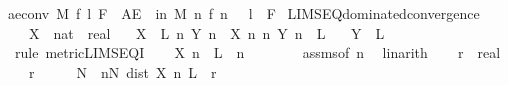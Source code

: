 \begin{isabellebody}
{\isachardoublequoteopen}ae{\isacharunderscore}{\kern0pt}conv\ M\ f{\isacharprime}{\kern0pt}\ l\ F\ {\isasymlongleftrightarrow}\ {\isacharparenleft}{\kern0pt}AE\ {\isasymomega}\ in\ M{\isachardot}{\kern0pt}\ {\isacharparenleft}{\kern0pt}{\isacharparenleft}{\kern0pt}{\isasymlambda}n{\isachardot}{\kern0pt}\ f{\isacharprime}{\kern0pt}\ n\ {\isasymomega}{\isacharparenright}{\kern0pt}\ {\isasymlonglongrightarrow}\ l\ {\isasymomega}{\isacharparenright}{\kern0pt}\ F{\isacharparenright}{\kern0pt}{\isachardoublequoteclose}\isanewline
\isanewline
{}\isamarkupfalse%
\ LIMSEQ{\isacharunderscore}{\kern0pt}dominated{\isacharunderscore}{\kern0pt}convergence{\isacharcolon}{\kern0pt}\isanewline
\ \ \ X\ {\isacharcolon}{\kern0pt}{\isacharcolon}{\kern0pt}\ {\isachardoublequoteopen}nat\ {\isasymRightarrow}\ real{\isachardoublequoteclose}\isanewline
\ \ \ {\isachardoublequoteopen}X\ {\isasymlonglonglongrightarrow}\ L{\isachardoublequoteclose}\ {\isachardoublequoteopen}{\isacharparenleft}{\kern0pt}{\isasymAnd}n{\isachardot}{\kern0pt}\ Y\ n\ {\isasymle}\ X\ n{\isacharparenright}{\kern0pt}{\isachardoublequoteclose}\ {\isachardoublequoteopen}{\isacharparenleft}{\kern0pt}{\isasymAnd}n{\isachardot}{\kern0pt}\ Y\ n\ {\isasymge}\ L{\isacharparenright}{\kern0pt}{\isachardoublequoteclose}\isanewline
\ \ \ {\isachardoublequoteopen}Y\ {\isasymlonglonglongrightarrow}\ L{\isachardoublequoteclose}\isanewline
%
\isadelimproof
%
\endisadelimproof
%
\isatagproof
{}\isamarkupfalse%
\ {\isacharparenleft}{\kern0pt}rule\ metric{\isacharunderscore}{\kern0pt}LIMSEQ{\isacharunderscore}{\kern0pt}I{\isacharparenright}{\kern0pt}\isanewline
\ \ \isamarkupfalse%
\ {\isachardoublequoteopen}X\ n\ {\isasymge}\ L{\isachardoublequoteclose}\ \ n\isanewline
\ \ \ \ \ \ \isamarkupfalse%
\ assms{\isacharparenleft}{\kern0pt}{}{\isacharcomma}{\kern0pt}{}{\isacharparenright}{\kern0pt}{\isacharbrackleft}{\kern0pt}of\ n{\isacharbrackright}{\kern0pt}\ \isamarkupfalse%
\ linarith\isanewline
\ \ \isamarkupfalse%
\ r\ {\isacharcolon}{\kern0pt}{\isacharcolon}{\kern0pt}\ real\ \isamarkupfalse%
\ {\isachardoublequoteopen}{}\ {\isacharless}{\kern0pt}\ r{\isachardoublequoteclose}\isanewline
\ \ \isamarkupfalse%
\ \isamarkupfalse%
\ N\ \ {\isachardoublequoteopen}{\isasymforall}n{\isasymge}N{\isachardot}{\kern0pt}\ dist\ {\isacharparenleft}{\kern0pt}X\ n{\isacharparenright}{\kern0pt}\ L\ {\isacharless}{\kern0pt}\ r{\isachardoublequoteclose}\isanewline

\end{isabellebody}
